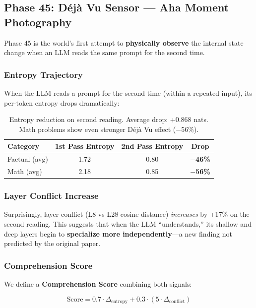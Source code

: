 \documentclass[11pt,a4paper]{article}
\begin{document}
\subsection{Phase 45: D\'{e}j\`{a} Vu Sensor --- Aha Moment Photography}

Phase 45 is the world's first attempt to \textbf{physically observe} the
internal state change when an LLM reads the same prompt for the second time.

\subsubsection{Entropy Trajectory}

When the LLM reads a prompt for the second time (within a repeated input),
its per-token entropy drops dramatically:

\begin{table}[H]
\centering
\begin{tabular}{lccc}
\toprule
\textbf{Category} & \textbf{1st Pass Entropy} & \textbf{2nd Pass Entropy} & \textbf{Drop} \\
\midrule
Factual (avg) & 1.72 & 0.80 & \textcolor{success}{\textbf{$-$46\%}} \\
Math (avg) & 2.18 & 0.85 & \textcolor{success}{\textbf{$-$56\%}} \\
\bottomrule
\end{tabular}
\caption{Entropy reduction on second reading. Average drop: +0.868 nats.
Math problems show even stronger D\'{e}j\`{a} Vu effect ($-$56\%).}
\end{table}

\subsubsection{Layer Conflict Increase}

Surprisingly, layer conflict (L8 vs L28 cosine distance) \emph{increases}
by +17\% on the second reading. This suggests that when the LLM ``understands,''
its shallow and deep layers begin to \textbf{specialize more independently}---a
new finding not predicted by the original paper.

\subsubsection{Comprehension Score}

We define a \textbf{Comprehension Score} combining both signals:

\begin{equation}
\text{Score} = 0.7 \cdot \Delta_{\text{entropy}} + 0.3 \cdot (5 \cdot \Delta_{\text{conflict}})
\end{equation}
\end{document}
